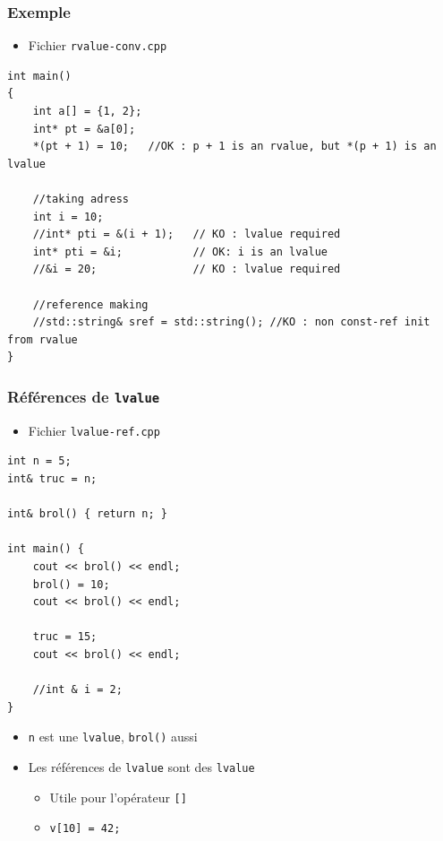 \begin{frame}[containsverbatim]
\frametitle{Exemple}
\begin{itemize}
\item Fichier \texttt{rvalue-conv.cpp}
\end{itemize}
\begin{lstlisting}
int main()
{
	int a[] = {1, 2};
	int* pt = &a[0];
	*(pt + 1) = 10;   //OK : p + 1 is an rvalue, but *(p + 1) is an lvalue

	//taking adress
	int i = 10;
	//int* pti = &(i + 1);   // KO : lvalue required
	int* pti = &i;           // OK: i is an lvalue
	//&i = 20;               // KO : lvalue required

	//reference making
	//std::string& sref = std::string(); //KO : non const-ref init from rvalue
}
\end{lstlisting}
\end{frame}

\begin{frame}[containsverbatim]
\frametitle{Références de \texttt{lvalue}}
\begin{itemize}
\item Fichier \texttt{lvalue-ref.cpp}
\end{itemize}
\begin{lstlisting}
int n = 5;
int& truc = n;

int& brol() { return n; }

int main() {
	cout << brol() << endl;
	brol() = 10;
	cout << brol() << endl;

	truc = 15;
	cout << brol() << endl;

	//int & i = 2;
}
\end{lstlisting}
\begin{itemize}
\item \texttt{n} est une \texttt{lvalue}, \texttt{brol()} aussi
\item Les références de \texttt{lvalue} sont des \texttt{lvalue}
	\begin{itemize}
	\item Utile pour l'opérateur \texttt{[]}
	\item \texttt{v[10] = 42;}
	\end{itemize}
\end{itemize}
\end{frame}

